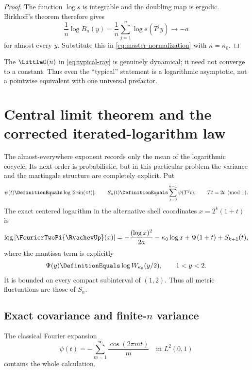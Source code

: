 \documentclass[11pt,oneside]{article}
\numberwithin{equation}{section}
\theoremstyle{definition}
\theoremstyle{remark}
\begin{document}
\begin{proof}
The function $\log s$ is integrable and the doubling map is ergodic.  Birkhoff's theorem
therefore gives
\[
 \frac1n\log B_n(y)=\frac1n\sum_{j=1}^{n}\log s(T^jy)\longrightarrow-a
\]
for almost every $y$.  Substitute this in \eqref{eq:master-normalization} with
$\kappa=\kappa_0$.
\end{proof}

The $\LittleO(n)$ in \eqref{eq:typical-ray} is genuinely dynamical; it need not converge to a
constant.  Thus even the ``typical'' statement is a logarithmic asymptotic, not a pointwise
equivalent with one universal prefactor.


\section{Central limit theorem and the corrected iterated-logarithm law}
\label{sec:fluctuations}

The almost-everywhere exponent records only the mean of the logarithmic cocycle.  Its next
order is probabilistic, but in this particular problem the variance and the martingale
structure are completely explicit.  Put
\begin{equation}
 \psi(t)\DefinitionEquals\log|2\sin(\pi t)|,
 \qquad
 S_n(t)\DefinitionEquals\sum_{j=0}^{n-1}\psi(T^jt),
 \qquad Tt=2t\pmod1.
 \label{eq:psi-Sn}
\end{equation}
The exact centered logarithm in the alternative shell coordinates $x=2^k(1+t)$ is
\begin{equation}
 \log|\FourierTwoPi{\RvachevUp}(x)|
 =-\frac{(\log x)^2}{2a}-\kappa_0\log x+\Psi(1+t)+S_{k+1}(t),
 \label{eq:centered-log-final}
\end{equation}
where the mantissa term is explicitly
\begin{equation}
 \Psi(y)\DefinitionEquals\log W_{\kappa_0}(y/2),\qquad 1<y<2.
 \label{eq:Psi-mantissa}
\end{equation}
It is bounded on every compact subinterval of $(1,2)$.  Thus all metric fluctuations are
those of $S_n$.

\subsection{Exact covariance and finite-\texorpdfstring{$n$}{n} variance}

The classical Fourier expansion
\begin{equation}
 \psi(t)=-\sum_{m=1}^{\infty}\frac{\cos(2\pi mt)}{m}
 \quad\text{in }L^2(0,1)
 \label{eq:clausen}
\end{equation}
contains the whole calculation.
\end{document}
